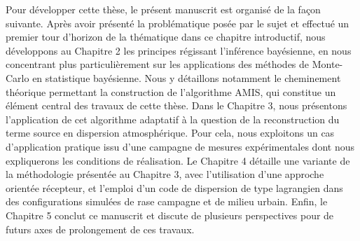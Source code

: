  Pour développer cette thèse, le présent manuscrit est organisé de la façon suivante. Après avoir présenté la problématique posée par le sujet et effectué un premier tour d'horizon de la thématique dans ce chapitre introductif, nous développons au Chapitre 2 les principes régissant l'inférence bayésienne, en nous concentrant plus particulièrement sur les applications des méthodes de Monte-Carlo en statistique bayésienne. Nous y détaillons notamment le cheminement théorique permettant la construction de l'algorithme AMIS, qui constitue un élément central des travaux de cette thèse. 
 Dans le Chapitre 3, nous présentons l'application de cet algorithme adaptatif à la question de la reconstruction du terme source en dispersion atmosphérique. Pour cela, nous exploitons un cas d'application pratique issu d'une campagne de mesures expérimentales dont nous expliquerons les conditions de réalisation. Le Chapitre 4 détaille une variante de la méthodologie présentée au Chapitre 3, avec l'utilisation d'une approche orientée récepteur, et l'emploi d'un code de dispersion de type lagrangien dans des configurations simulées de rase campagne et de milieu urbain.
 Enfin, le Chapitre 5 conclut ce manuscrit et discute de plusieurs perspectives pour de futurs axes de prolongement de ces travaux.\\